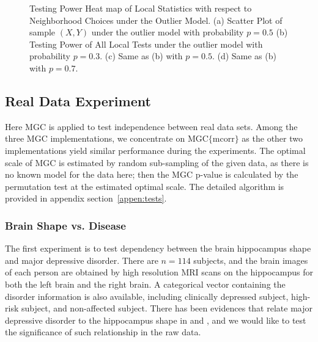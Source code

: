 \documentclass[11pt]{article}
\begin{document}
\begin{figure}[htbp]
{}
\hfil
{}
\caption{Testing Power Heat map of Local Statistics with respect to Neighborhood Choices under the Outlier Model.
(a) Scatter Plot of sample $(X,Y)$ under the outlier model with probability $p=0.5$
(b) Testing Power of All Local Tests under the outlier model with probability $p=0.3$.
(c) Same as (b) with $p=0.5$.
(d) Same as (b) with $p=0.7$.
}
\label{figSim3}
\end{figure}

\subsection{Real Data Experiment}
\label{numer3}
Here MGC is applied to test independence between real data sets. Among the three MGC implementations, we concentrate on MGC$\{$mcorr$\}$ as the other two implementations yield similar performance during the experiments. The optimal scale of MGC is estimated by random sub-sampling of the given data, as there is no known model for the data here; then the MGC p-value is calculated by the permutation test at the estimated optimal scale. The detailed algorithm is provided in appendix section~\ref{appen:tests}. 

\subsubsection{Brain Shape vs. Disease}

The first experiment is to test dependency between the brain hippocampus shape and major depressive disorder. There are $n=114$ subjects, and the brain images of each person are obtained by high resolution MRI scans on the hippocampus for both the left brain and the right brain. A categorical vector containing the disorder information is also available, including clinically depressed subject, high-risk subject, and non-affected subject. There has been evidences that relate major depressive disorder to the hippocampus shape in \cite{ParkEtAl2011} and \cite{PosenerEtAl2003}, and we would like to test the significance of such relationship in the raw data. 
\end{document}
